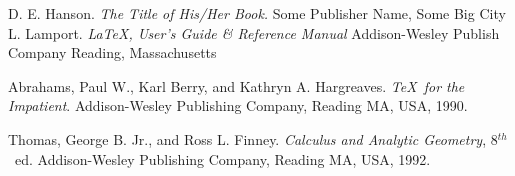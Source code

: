 \documentclass[11pt,doublespace]{unhthesis}
\begin{document}
\begin{thebibliography}{XxxxNN}                 %
   D. E. Hanson.      %
      {\em The Title of His/Her Book.}          %
      Some Publisher Name,                      %
      Some Big City                             %
   L. Lamport.      %
      {\em LaTeX, User's Guide \& Reference     %
      Manual}                                   %
      Addison-Wesley Publish Company            %
      Reading, Massachusetts                    %

   Abrahams, Paul W., 
    Karl Berry, and Kathryn A. Hargreaves.  
    {\em \TeX\ for the Impatient}.  
    Addison-Wesley Publishing Company, 
    Reading MA, USA, 1990.


   Thomas, George B. Jr., 
    and Ross L. Finney. 
    {\em Calculus and Analytic Geometry}, 
    8$^{th}$\ ed.  
    Addison-Wesley Publishing Company, 
    Reading MA, USA, 1992.

\end{thebibliography}                           %

\appendix                                       %
  \begin{singlespace}                           %
\end{singlespace}                               %
\end{document}
